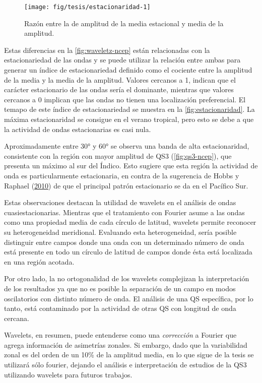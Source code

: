 \documentclass[spanish,a4paper,12p]{book}
\begin{document}
\begin{figure*}
\texttt{[image: fig/tesis/estacionaridad-1]} \caption{Razón entre la de amplitud de la media estacional y media de la amplitud.}\label{fig:estacionaridad}
\end{figure*}

Estas diferencias en la \autoref{fig:waveletz-ncep} están relacionadas
con la estacionariedad de las ondas y se puede utilizar la relación
entre ambas para generar un índice de estacionariedad definido como el
cociente entre la amplitud de la media y la media de la amplitud.
Valores cercanos a 1, indican que el carácter estacionario de las ondas
sería el dominante, mientras que valores cercanos a 0 implican que las
ondas no tienen una localización preferencial. El temapo de este índice
de estacionariedad se muestra en la \autoref{fig:estacionaridad}. La
máxima estacionaridad se consigue en el verano tropical, pero esto se
debe a que la actividad de ondas estacionarias es casi nula.

Aproximadamente entre 30° y 60° se observa una banda de alta
estacionaridad, consistente con la región con mayor amplitud de QS3
(\autoref{fig:qs3-ncep}), que presenta un máximo al sur del Índico. Esto
sugiere que esta región la actividad de onda es particularmente
estacionaria, en contra de la sugerencia de Hobbs y Raphael
(\protect\hyperlink{ref-Hobbs2010}{2010}) de que el principal patrón
estacionario se da en el Pacífico Sur.

Estas observaciones destacan la utilidad de wavelets en el análisis de
ondas cuasiestacionarias. Mientras que el tratamiento con Fourier asume
a las ondas como una propiedad media de cada círculo de latitud,
wavelets permite reconocer su heterogeneidad meridional. Evaluando esta
heterogeneidad, sería posible distinguir entre campos donde una onda con
un determinado número de onda está presente en todo un círculo de
latitud de campos donde ésta está localizada en una región acotada.

Por otro lado, la no ortogonalidad de los wavelets complejizan la
interpretación de los resultados ya que no es posible la separación de
un campo en modos oscilatorios con distinto número de onda. El análisis
de una QS específica, por lo tanto, está contaminado por la actividad de
otras QS con longitud de onda cercana.

Wavelets, en resumen, puede entenderse como una \emph{corrección} a
Fourier que agrega información de asimetrías zonales. Si embargo, dado
que la variabilidad zonal es del orden de un 10\% de la amplitud media,
en lo que sigue de la tesis se utilizará sólo fourier, dejando el
análisis e interpretación de estudios de la QS3 utilizando wavelets para
futuros trabajos.
\end{document}
